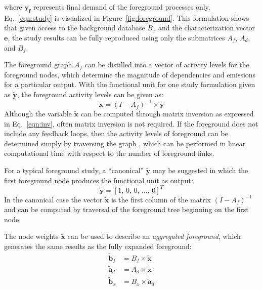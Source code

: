 where $\mathbf{y_f}$ represents final demand of the foreground processes only.  Eq.~\ref{eqn:study} is visualized in Figure~\ref{fig:foreground}.  This formulation shows that given access to the background database $B_x$ and the characterization vector $\mathbf{e}$, the study results can be fully reproduced using only the submatrices $A_f$, $A_d$, and $B_f$.  %

The foreground graph $A_f$ can be distilled into a vector of activity levels for the foreground nodes, which determine the magnitude of dependencies and emissions for a particular output.  With the functional unit for one study formulation given as $\tilde{\mathbf{y}}$, the foreground activity levels can be given as:
\begin{equation}
\tilde{\mathbf{x}} = (I - A_f)^{-1} \times \tilde{\mathbf{y}}
\label{eqn:inv}
\end{equation}
Although the variable $\tilde{\mathbf{x}}$ can be computed through matrix inversion as expressed in Eq.~\ref{eqn:inv}, often matrix inversion is not required.  If the foreground does not include any feedback loops, then the activity levels of foreground can be determined simply by traversing the graph \citep{Bapat_LAA_2013}, which can be performed in linear computational time with respect to the number of foreground links.

For a typical foreground study, a ``canonical'' $\tilde{\mathbf{y}}$ may be suggested in which the first foreground node produces the functional unit as output:
\begin{equation}
\tilde{\mathbf{y}} =  [ 1,\, 0,\, 0 ,\,\ldots,\, 0]^{T}
\end{equation}
In the canonical case the vector $\tilde{\mathbf{x}}$ is the first column of the matrix $(I-A_f)^{-1}$  and can be computed by traversal of the foreground tree beginning on the first node.

The node weights $\tilde{\mathbf{x}}$ can be used to describe an \emph{aggregated foreground}, which generates the same results as the fully expanded foreground:
\begin{equation}
\begin{array}{rl}
    \tilde{\mathbf{b}}_f & = B_f \times \tilde{\mathbf{x}} \\
    \tilde{\mathbf{a}}_d & = A_d \times \tilde{\mathbf{x}} \\
    \tilde{\mathbf{b}}_x & = B_x \times \tilde{\mathbf{a}}_d
\end{array}
\label{eqn:agg}
\end{equation}

